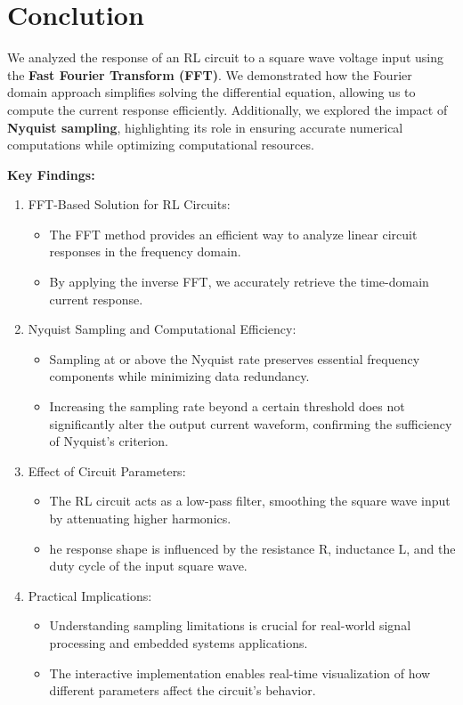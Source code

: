 \documentclass[journal]{IEEEtran}
\begin{document}
\section{Conclution}
We analyzed the response of an RL circuit to a square wave voltage input using the \textbf{Fast Fourier Transform (FFT)}. We demonstrated how the Fourier domain approach simplifies solving the differential equation, allowing us to compute the current response efficiently. Additionally, we explored the impact of \textbf{Nyquist sampling}, highlighting its role in ensuring accurate numerical computations while optimizing computational resources.

\textbf{Key Findings: }
\begin{enumerate}
    \item FFT-Based Solution for RL Circuits:
    \begin{itemize}
        \item The FFT method provides an efficient way to analyze linear circuit responses in the frequency domain.
        \item By applying the inverse FFT, we accurately retrieve the time-domain current response.
    \end{itemize}
    \item Nyquist Sampling and Computational Efficiency:
    \begin{itemize}
        \item Sampling at or above the Nyquist rate preserves essential frequency components while minimizing data redundancy.
        \item Increasing the sampling rate beyond a certain threshold does not significantly alter the output current waveform, confirming the sufficiency of Nyquist's criterion.
    \end{itemize}
    \item Effect of Circuit Parameters:
    \begin{itemize}
        \item The RL circuit acts as a low-pass filter, smoothing the square wave input by attenuating higher harmonics.
        \item he response shape is influenced by the resistance R, inductance L, and the duty cycle of the input square wave.
    \end{itemize}
    \item Practical Implications:
    \begin{itemize}
        \item Understanding sampling limitations is crucial for real-world signal processing and embedded systems applications.
        \item The interactive implementation enables real-time visualization of how different parameters affect the circuit's behavior.

    \end{itemize}
\end{enumerate}
\end{document}
